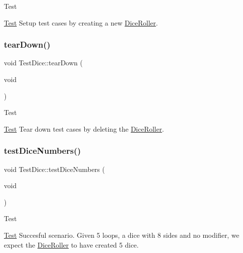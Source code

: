 \begin{DoxyRefDesc}{Test}
\item[\hyperlink{test__test000013}{Test}]Setup test cases by creating a new \hyperlink{class_dice_roller}{Dice\+Roller}. \end{DoxyRefDesc}
\hypertarget{class_test_dice_af92d20c1d04e258061ebba44ac109d43}{}\label{class_test_dice_af92d20c1d04e258061ebba44ac109d43} 
\subsubsection{\texorpdfstring{tear\+Down()}{tearDown()}}
{\footnotesize\ttfamily void Test\+Dice\+::tear\+Down (\begin{DoxyParamCaption}\item[{void}]{ }\end{DoxyParamCaption})}

\begin{DoxyRefDesc}{Test}
\item[\hyperlink{test__test000014}{Test}]Tear down test cases by deleting the \hyperlink{class_dice_roller}{Dice\+Roller}. \end{DoxyRefDesc}
\hypertarget{class_test_dice_a4d859f50f9c34b68557d2f78d924de65}{}\label{class_test_dice_a4d859f50f9c34b68557d2f78d924de65} 
\subsubsection{\texorpdfstring{test\+Dice\+Numbers()}{testDiceNumbers()}}
{\footnotesize\ttfamily void Test\+Dice\+::test\+Dice\+Numbers (\begin{DoxyParamCaption}\item[{void}]{ }\end{DoxyParamCaption})\hspace{0.3cm}{\ttfamily [protected]}}

\begin{DoxyRefDesc}{Test}
\item[\hyperlink{test__test000006}{Test}]Succesful scenario. Given 5 loops, a dice with 8 sides and no modifier, we expect the \hyperlink{class_dice_roller}{Dice\+Roller} to have created 5 dice. \end{DoxyRefDesc}
\hypertarget{class_test_dice_a6b0079bc572dd67e553f13d7015e8b0f}{}\label{class_test_dice_a6b0079bc572dd67e553f13d7015e8b0f} 
